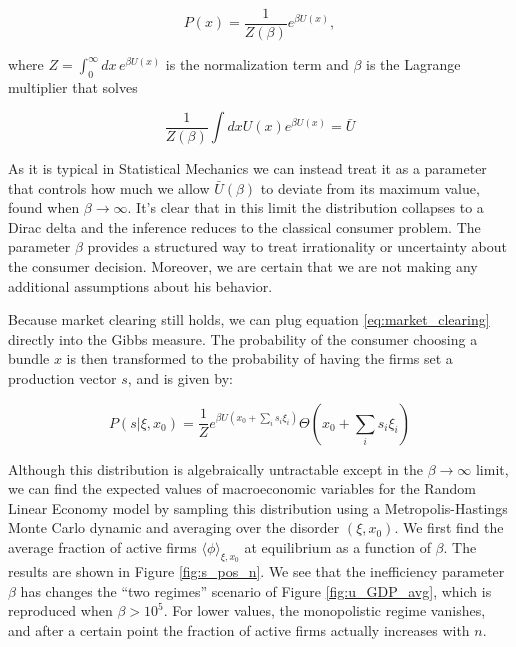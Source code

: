 \begin{equation}
  \label{eq:gibbs}
  P(x) = \frac{1}{Z(\beta)} e^{\beta U(x)},
\end{equation}

where $Z = \int_0^\infty dx \, e^{\beta U(x)}$ is the normalization term
and $\beta$ is the Lagrange multiplier that solves 

\begin{equation}
  \frac{1}{Z(\beta)} \int dx U(x) e^{\beta U(x)}  = \bar{U}
\end{equation}

As it is typical in Statistical Mechanics we can instead treat it as a parameter that controls how much we allow $\bar{U}(\beta)$ to deviate from its maximum value, found when $\beta \to \infty$. It's clear that in this limit the distribution collapses to a Dirac delta and the
inference reduces to the classical consumer problem. The parameter
$\beta$ provides a structured way to treat irrationality or uncertainty about the consumer decision. Moreover, we are certain that we are not making any additional assumptions about his behavior.

Because market clearing still holds, we can plug equation
\eqref{eq:market_clearing} directly into the Gibbs measure. The
probability of the consumer choosing a bundle $x$ is then transformed
to the probability of having the firms set a production vector $s$,
and is given by:

\begin{equation}
  \label{eq:inef_1}
  P(s | \xi, x_0) = \frac{1}{Z} e^{\beta U(x_0 + \sum_i s_i \xi_i)}\Theta(x_0 + \sum_i s_i \xi_i)
\end{equation}

Although this distribution is algebraically untractable except in the
$\beta \to \infty$ limit, we can find the expected values of
macroeconomic variables for the Random Linear Economy model by
sampling this distribution using a Metropolis-Hastings Monte Carlo
dynamic and averaging over the disorder $(\xi, x_0)$. We first find the average fraction of active
firms $\langle \phi \rangle_{\xi, x_0}$ at equilibrium as a
function of $\beta$. The results are shown in Figure
\ref{fig:s_pos_n}. We see that the inefficiency parameter $\beta$ has
changes the ``two regimes'' scenario of Figure \ref{fig:u_GDP_avg}, which is reproduced when $\beta > 10^5$. For lower values, the
monopolistic regime vanishes, and after a certain point the fraction of
active firms actually increases with $n$.


